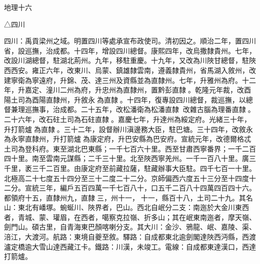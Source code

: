 
\begin{pinyinscope}
地理十六

△四川

四川：禹貢梁州之域。明置四川等處承宣布政使司。清初因之。順治二年，置四川省，設巡撫，治成都。十四年，增設四川總督。康熙四年，改烏撒隸貴州。七年，改設川湖總督，駐湖北荊州。九年，移駐重慶。十九年，又改為川陜甘總督，駐陜西西安。雍正六年，改東川、烏蒙、鎮雄隸雲南，遵義隸貴州，省馬湖入敘州，改建寧衛為寧遠府，升錦、茂、達三州及資縣並為直隸州。七年，升雅州為府。十二年，升嘉定、潼川二州為府，升忠州為直隸州，置黔彭直隸。乾隆元年裁，改酉陽土司為酉陽直隸州，升敘永為直隸。十四年，復專設四川總督，裁巡撫，以總督兼理巡撫事，治成都。二十五年，改松潘衛為松潘直隸，改雜古腦為理番直隸。二十六年，改石砫土司為石砫直隸。嘉慶七年，升達州為綏定府。光緒三十年，升打箭爐為直隸。三十二年，設督辦川滇邊務大臣，駐巴塘。三十四年，改敘永為永寧直隸州，升打箭爐為康定府，升巴安縣為巴安府。宣統元年，改德爾格忒土司為登科府。東至湖北巴東縣；一千七百六十里。西至甘肅西寧番界；一千二百四十里。南至雲南元謀縣；二千三十里。北至陜西寧羌州。一千一百八十里。廣三千里，袤三千二百里。由康定府至前藏拉薩，駐藏辦事大臣駐。四千七百一十里。北極高二十七度五十四分至三十二度二十二分。京師偏西六度五十三分至十四度十二分。宣統三年，編戶五百四萬一千七百八十，口五千二百八十四萬四百四十六。都領府十五，直隸州九，直隸三，州十一，十一，縣百十八，土司二十九。其名山：東北有嶓塚。蜿蜒川、陜界者，巴山。西北自岷分二支：南迤於大金川東西者，青城、蒙、瓘眉，在西者，噶察克拉嶺、折多山；其在岷東南迤者，摩天嶺、劍門山。碩古里，自青海東巴顏喀喇分支。其大川：金沙、鴉龍、岷、嘉陵、渠、涪江，大渡河。航路：東境自夔至敘。驛路：自成都東北逾劍閣達陜西沔縣，西渡瀘定橋逾大雪山達西藏江卡。鐵路：川漢，未竣工。電線：自成都東達漢口，西達打箭爐。


\end{pinyinscope}
